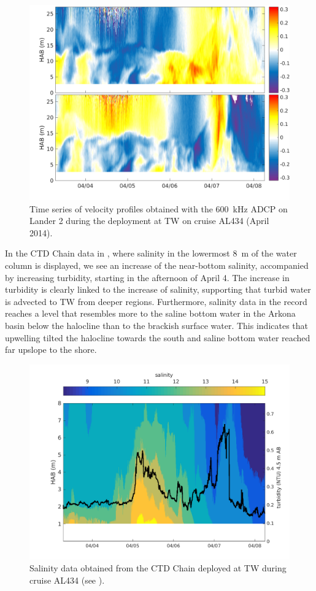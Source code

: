 \begin{figure}[ht]
\includegraphics[width=40pc]{bilder/adcp600.png}
 \caption{Time series of velocity profiles obtained with the 600~kHz ADCP on 
Lander 2 during the deployment at TW on cruise AL434 (April 2014).}
 \label{adcp600}
 \end{figure}

 In the CTD Chain data in , where salinity in the lowermost 8~m 
of the water column is displayed, we see an increase of the 
near-bottom salinity, accompanied by increasing turbidity, starting in the 
afternoon of April 4. The increase in turbidity is clearly linked to the 
increase of salinity, supporting that turbid water is advected to TW from deeper 
regions. Furthermore, salinity data in the record reaches a level that 
resembles more to the saline bottom water in the Arkona basin below the 
halocline than to the brackish surface water. This indicates that upwelling 
tilted the halocline towards the south and saline bottom water reached far 
upslope to the shore.

 \begin{figure}[ht]
\includegraphics[width=15cm]{bilder/ctdchaintw.png}
 \caption{Salinity data obtained from the CTD Chain deployed at TW 
during cruise AL434 (see ).}
 \label{ctdchain}
 \end{figure}

